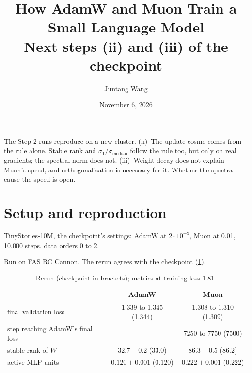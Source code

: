 \documentclass[10pt]{article}
\title{How AdamW and Muon Train a Small Language Model\\[1pt]
\normalfont Next steps (ii) and (iii) of the checkpoint}
\author{Juntang Wang}
\date{November 6, 2026}
\makeatletter
\renewcommand\paragraph{\@startsection{paragraph}{4}{\z@}{1.0ex \@plus .3ex \@minus .2ex}{-1em}{\normalfont\normalsize\bfseries}}
\renewcommand\maketitle{\begin{center}{\large\bfseries\@title\par}\vspace{3pt}\@author\quad\textperiodcentered\quad\@date\end{center}}
\makeatother
\begin{document}
\maketitle
\vspace{-0.8em}

\paragraph{Summary.} The Step 2 runs reproduce on a new cluster. (ii)~The update cosine comes from the rule alone. Stable rank and $\sigma_1/\sigma_{\mathrm{median}}$ follow the rule too, but only on real gradients; the spectral norm does not. (iii)~Weight decay does not explain Muon's speed, and orthogonalization is necessary for it. Whether the spectra cause the speed is open.

\section{Setup and reproduction}
\label{sec:setup}

TinyStories-10M, the checkpoint's settings: AdamW at $2\cdot10^{-3}$, Muon at 0.01, 10{,}000 steps, data orders 0 to 2.

Run on FAS RC Cannon. The rerun agrees with the checkpoint (\cref{tab:repro}).

\begin{table}[H]
\centering
\small
\caption{Rerun (checkpoint in brackets); metrics at training loss 1.81.}
\label{tab:repro}
\begin{tabular}{l cc}
\toprule
 & AdamW & Muon \\
\midrule
final validation loss & 1.339 to 1.345 (1.344) & 1.308 to 1.310 (1.309) \\
step reaching AdamW's final loss & & 7250 to 7750 (7500) \\
stable rank of $W$ & $32.7 \pm 0.2$ ($33.0$) & $86.3 \pm 0.5$ ($86.2$) \\
active MLP units & $0.120 \pm 0.001$ ($0.120$) & $0.222 \pm 0.001$ ($0.222$) \\
\bottomrule
\end{tabular}
\end{table}

\end{document}
